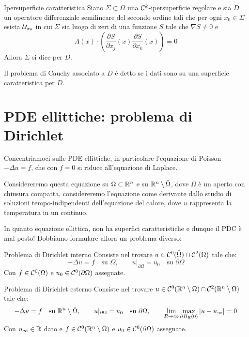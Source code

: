 \documentclass{article}
\begin{document}
\begin{definition}{Ipersuperficie caratteristica}{}
    Siano $\Sigma \subset \Omega$ una $\mathcal{C}^k$-ipersuperficie regolare e sia $D$ un operatore differenziale semilineare del secondo ordine tali che per ogni $x_0 \in \Sigma$ esista $\mathcal{U}_{x_0}$ in cui $\Sigma$ sia luogo di zeri di una funzione $S$ tale che $\nabla S\neq 0$ e 
    \[A(x) \cdot \left(\frac{\partial S}{\partial x_j}(x) \frac{\partial S}{\partial x_k}(x)\right) = 0\]
    Allora $\Sigma$ si dice  per $D$.
\end{definition}

Il problema di Cauchy associato a $D$ è detto  se i dati sono su una superficie caratteristica per $D$.

\section{PDE ellittiche: problema di Dirichlet}

Concentriamoci sulle PDE ellittiche, in particolare l'equazione di Poisson $-\Delta u = f$, che con $f=0$ si riduce all'equazione di Laplace.

Considereremo questa equazione su $\Omega \subset \mathbb{R}^n$ e su $\mathbb{R}^n \setminus \bar{\Omega}$, dove $\Omega$ è un aperto con chiusura compatta, considereremo l'equazione come derivante dallo studio di soluzioni tempo-indipendenti dell'equazione del calore, dove $u$ rappresenta la temperatura in un continuo.

In quanto equazione ellittica, non ha superfici caratteristiche \Nick e dunque il PDC è mal posto! Dobbiamo formulare allora un problema diverso:

\begin{definition}{Problema di Dirichlet interno}{}
    Consiste nel trovare $u\in\mathcal{C}^0(\bar{\Omega})\cap\mathcal{C}^2(\Omega)$ tale che:
    \[-\Delta u = f \quad\text{su } \Omega, \qquad u|_{\partial\Omega} = u_0 \quad \text{su }\partial\Omega\] 
    Con $f \in \mathcal{C}^0(\Omega)$ e $u_0 \in \mathcal{C}^0(\partial\Omega)$ assegnate.
\end{definition}

\begin{definition}{Problema di Dirichlet esterno}{}
    Consiste nel trovare $u \in \mathcal{C}^0(\mathbb{R}^n \setminus \Omega)\cap\mathcal{C}^2(\mathbb{R}^n \setminus \bar{\Omega})$ tale che:
    \[-\Delta u = f \quad\text{su } \mathbb{R}^n \setminus \bar{\Omega}, \qquad u|_{\partial\Omega} = u_0 \quad \text{su }\partial\Omega, \qquad \lim_{R\to\infty} \max_{\partial B_R(0)} |u-u_\infty| = 0\]
    Con $u_\infty \in \mathbb{R}$ dato e $f \in \mathcal{C}^0(\mathbb{R}^n \setminus \bar{\Omega})$ e $u_0 \in \mathcal{C}^0(\partial\Omega)$ assegnate.
\end{definition}
\end{document}
